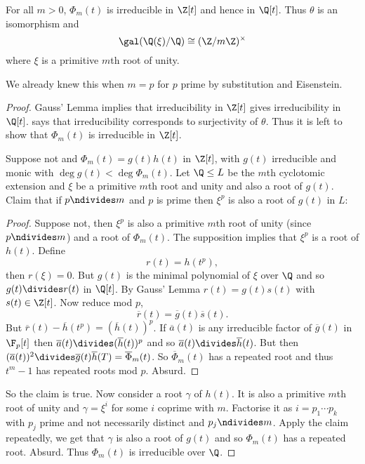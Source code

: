 \documentclass[a4paper]{article}
\newcommand*{\red}[1]{\overline{#1}}
\begin{document}
\begin{theorem}
  \label{thm:cyclotomic extension of Q}
  For all \(m > 0\), \(\Phi_m(t)\) is irreducible in \(\Z[t]\) and hence in \(\Q[t]\). Thus \(\theta\) is an isomorphism and
  \[
    \gal(\Q(\xi)/\Q) \cong (\Z/m\Z)^\times
  \]
  where \(\xi\) is a primitive \(m\)th root of unity.
\end{theorem}

\begin{remark}
  We already knew this when \(m = p\) for \(p\) prime by substitution and Eisenstein.
\end{remark}

\begin{proof}
  Gauss' Lemma implies that irreducibility in \(\Z[t]\) gives irreducibility in \(\Q[t]\).  says that irreducibility corresponds to surjectivity of \(\theta\). Thus it is left to show that \(\Phi_m(t)\) is irreducible in \(\Z[t]\).

  Suppose not and \(\Phi_m(t) = g(t)h(t)\) in \(\Z[t]\), with \(g(t)\) irreducible and monic with \(\deg g(t) < \deg \Phi_m(t)\). Let \(\Q \leq L\) be the \(m\)th cyclotomic extension and \(\xi\) be a primitive \(m\)th root and unity and also a root of \(g(t)\). Claim that if \(p \ndivides m\) and \(p\) is prime then \(\xi^p\) is also a root of \(g(t)\) in \(L\):

  \begin{proof}
    Suppose not, then \(\xi^p\) is also a primitive \(m\)th root of unity (since \(p \ndivides m\)) and a root of \(\Phi_m(t)\). The supposition implies that \(\xi^p\) is a root of \(h(t)\). Define
    \[
      r(t) = h(t^p),
    \]
    then \(r(\xi) = 0\). But \(g(t)\) is the minimal polynomial of \(\xi\) over \(\Q\) and so \(g(t) \divides r(t)\) in \(\Q[t]\). By Gauss' Lemma \(r(t) = g(t)s(t)\) with \(s(t) \in \Z[t]\). Now reduce mod \(p\),
    \[
      \red r(t) = \red g(t) \red s(t).
    \]
    But \(\red r(t) - \red h(t^p) = (\red h(t))^p\). If \(\red a(t)\) is any irreducible factor of \(\red g(t)\) in \(\F_p[t]\) then \(\red a(t) \divides (\red h(t))^p\) and so \(\red a(t) \divides \red h(t)\). But then \((\red a(t))^2 \divides \red g(t) \red h(T) = \red \Phi_m(t)\). So \(\red \Phi_m(t)\) has a repeated root and thus \(t^m - 1\) has repeated roots mod \(p\). Absurd.
  \end{proof}
  
  So the claim is true. Now consider a root \(\gamma\) of \(h(t)\). It is also a primitive \(m\)th root of unity and \(\gamma = \xi^i\) for some \(i\) coprime with \(m\). Factorise it as \(i = p_1 \cdots p_k\) with \(p_j\) prime and not necessarily distinct and \(p_j \ndivides m\). Apply the claim repeatedly, we get that \(\gamma\) is also a root of \(g(t)\) and so \(\Phi_m(t)\) has a repeated root. Absurd. Thus \(\Phi_m(t)\) is irreducible over \(\Q\).
\end{proof}
\end{document}
